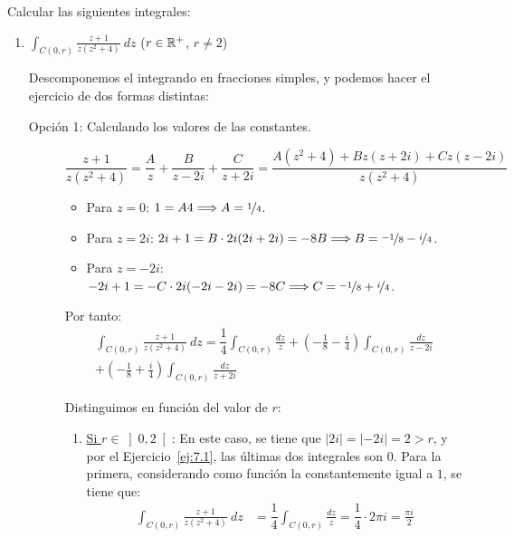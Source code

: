 \begin{ejercicio}
    Calcular las siguientes integrales:
    \begin{enumerate}
        \item $\displaystyle\int_{C(0,r)} \frac{z+1}{z(z^2+4)}\ dz$ \qquad ($r \in \mathbb{R}^+$, $r \neq 2$)
        
        Descomponemos el integrando en fracciones simples, y podemos hacer el ejercicio de dos formas distintas:
        \begin{description}
            \item [Opción 1: Calculando los valores de las constantes.] 
                \begin{equation*}
                    \frac{z+1}{z(z^2+4)} = \frac{A}{z} + \frac{B}{z-2i} + \frac{C}{z+2i}
                    = \frac{A(z^2+4) + Bz(z+2i) + Cz(z-2i)}{z(z^2+4)}
                \end{equation*}
                \begin{itemize}
                    \item Para $z=0$: $1=A4\Longrightarrow A=\nicefrac{1}{4}$.
                    \item Para $z=2i$: $2i+1 = B\cdot 2i(2i+2i)=-8B\Longrightarrow B=\nicefrac{-1}{8}-\nicefrac{i}{4}$.
                    \item Para $z=-2i$: $-2i+1 = -C\cdot 2i(-2i-2i)=-8C\Longrightarrow C=\nicefrac{-1}{8}+\nicefrac{i}{4}$.
                \end{itemize}

                Por tanto:
                \begin{multline*}
                    \int_{C(0,r)} \frac{z+1}{z(z^2+4)}\ dz = \dfrac{1}{4}\int_{C(0,r)} \frac{dz}{z} + \left(-\frac{1}{8}-\frac{i}{4}\right)\int_{C(0,r)} \frac{dz}{z-2i} \\ + \left(-\frac{1}{8}+\frac{i}{4}\right)\int_{C(0,r)} \frac{dz}{z+2i}
                \end{multline*}

                Distinguimos en función del valor de $r$:
                \begin{enumerate}
                    \item \ul{Si $r\in \left]0,2\right[$}: En este caso, se tiene que $|2i|=|-2i|=2>r$, y por el Ejercicio~\ref{ej:7.1}, las últimas dos integrales son $0$. Para la primera, considerando como función la constantemente igual a $1$, se tiene que:
                    \begin{align*}
                        \int_{C(0,r)} \frac{z+1}{z(z^2+4)}\ dz &= \dfrac{1}{4}\int_{C(0,r)} \frac{dz}{z} = \dfrac{1}{4}\cdot 2\pi i = \frac{\pi i}{2}
                    \end{align*}


\end{enumerate}
\end{description}
\end{enumerate}
\end{ejercicio}
